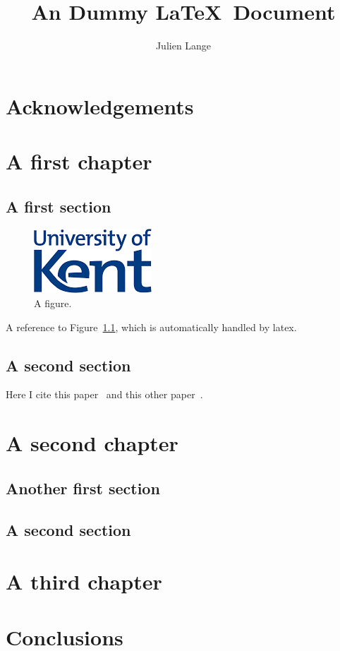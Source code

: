 \documentclass[11pt,a4paper]{book}
\author{Julien Lange}
\title{An Dummy \LaTeX\ Document}
\begin{document}
\maketitle 

\tableofcontents


\chapter*{Acknowledgements} 

\blindtext

\chapter{A first chapter}

\section{A first section}

\blindtext

\begin{figure}[t]
  \centering
  \includegraphics{kentlogo.png}
  \caption{A figure.}
  \label{fig:myfigure}
\end{figure}

\blindtext

A reference to Figure~\ref{fig:myfigure}, which is automatically
handled by latex.

\section{A second section}
\Blindtext

\Blindtext

Here I cite this paper~\cite{LangeY17} and this other
paper~\cite{LangeNTY17}.

\chapter{A second chapter}

\section{Another first section}
\blindtext

\section{A second section}
\blindtext

\chapter{A third chapter}

\Blindtext

\chapter{Conclusions}


\Blindtext





\end{document}
